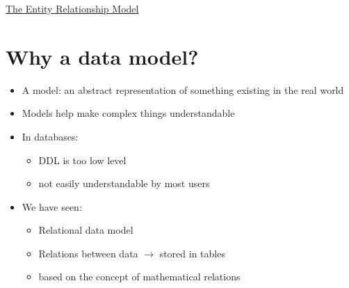 \documentclass{article}[18pt]
\begin{document}
\begin{center}
\underline{\huge The Entity Relationship Model}
\end{center}
\section{Why a data model?}
\begin{itemize}
\item A model: an abstract representation of something existing in the real world
\item Models help make complex things understandable
\item In databases:
\begin{itemize}
\item DDL is too low level
\item not easily understandable by most users
\end{itemize}
\item We have seen:
\begin{itemize}
\item Relational data model
\item Relations between data $\rightarrow$ stored in tables
\item based on the concept of mathematical relations
\end{itemize}
\end{itemize}
\end{document}
